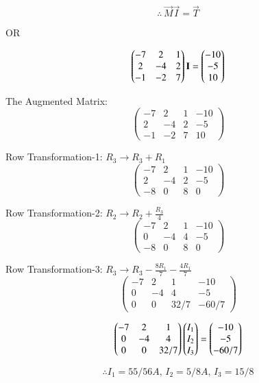 \documentclass[journal]{IEEEtran}
\begin{document}
\begin{equation}
    \therefore \, \vec{M}\vec{I}=\vec{T}
\end{equation}

\begin{center}
OR    
\end{center}

\begin{equation}
    \begin{pmatrix}-7 & 2 & 1 \\ 2 & -4 & 2 \\ -1 & -2 & 7\end{pmatrix}\mathbf{I} = \begin{pmatrix}-10 \\ -5 \\ 10\end{pmatrix}
\end{equation}

The Augmented Matrix:
\begin{equation}
\left(
\begin{array}{ccc|c}
     -7 & 2 & 1 & -10  \\
     2 & -4 & 2 & -5 \\
     -1 & -2 & 7 & 10 
\end{array}
\right)
\end{equation}

Row Transformation-1: $R_3 \rightarrow R_3 + R_1$
\begin{equation}
\left(
\begin{array}{ccc|c}
     -7 & 2 & 1 & -10  \\
     2 & -4 & 2 & -5 \\
     -8 & 0 & 8 & 0 
\end{array}
\right)
\end{equation}

Row Transformation-2: $R_2 \rightarrow R_2 + \frac{R_3}{4}$
\begin{equation}
\left(
\begin{array}{ccc|c}
     -7 & 2 & 1 & -10  \\
     0 & -4 & 4 & -5 \\
     -8 & 0 & 8 & 0 
\end{array}
\right)
\end{equation}

Row Transformation-3: $R_3 \rightarrow R_3 - \frac{8R_1}{7} - \frac{4R_1}{7}$
\begin{equation}
\left(
\begin{array}{ccc|c}
     -7 & 2 & 1 & -10  \\
     0 & -4 & 4 & -5 \\
     0 & 0 & 32/7 & -60/7 
\end{array}
\right)
\end{equation}

\bigskip

\begin{equation}
    \begin{pmatrix}-7 &  2 & 1 \\ 0 & -4 & 4 \\ 0 & 0 & 32/7 \end{pmatrix}\begin{pmatrix}I_1 \\ I_2 \\ I_3\end{pmatrix} = \begin{pmatrix}-10 \\ -5 \\ -60/7 \end{pmatrix}
\end{equation}

\bigskip

\begin{equation}
\boxed{\therefore I_1 = 55/56 A, \, I_2 = 5/8 A, \, I_3 = 15/8}
\end{equation}
\end{document}

